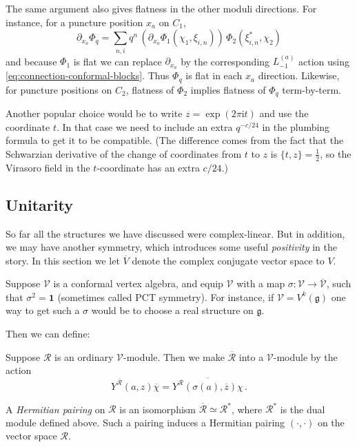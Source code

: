 \documentclass[12pt,letterpaper,reqno]{amsart}
\numberwithin{equation}{section}
\newcommand{\fg}{{\mathfrak g}}
\newcommand{\I}{{\mathrm i}}
\newcommand\bid{{\mathbf 1}}
\newcommand{\vertex}{\mathcal{V}}
\newcommand{\vrep}{\mathcal{R}}
\newcommand{\ti}[1]{\textit{#1}}
\begin{document}
The same argument also gives flatness in the other moduli directions.
For instance, for a puncture position $x_a$ on $C_1$,
\[
\partial_{x_a}\Phi_q
=
\sum_{n,i} q^n\, (\partial_{x_a}\Phi_1(\chi_1,\xi_{i,n}))\,\Phi_2(\xi^*_{i,n},\chi_2)
\]
and because $\Phi_1$ is flat we can replace $\partial_{x_a}$ by the corresponding $L_{-1}^{(a)}$ action
using \eqref{eq:connection-conformal-blocks}. Thus $\Phi_q$ is flat in each $x_a$ direction.
Likewise, for puncture positions on $C_2$, flatness of $\Phi_2$ implies flatness of $\Phi_q$ term-by-term.

Another popular choice would be to write $z = \exp(2 \pi \I t)$ and use the coordinate
$t$. In that case we need to include an extra $q^{-c/24}$ in the plumbing formula
to get it to be compatible.
(The difference comes from the fact that the Schwarzian derivative of the
change of coordinates from $t$ to $z$ is $\{t,z\} = \frac12$, 
so the Virasoro field in the $t$-coordinate has an extra $c/24$.)



\subsection{Unitarity}

So far all the structures we have discussed were complex-linear.
But in addition, we may have another symmetry, which introduces
some useful \ti{positivity} in the story.
In this section we let $\overline{V}$ denote the complex conjugate
vector space to $V$.

Suppose $\vertex$ is a conformal vertex algebra, and
equip $\vertex$ with a map $\sigma: \vertex \to \overline{\vertex}$,
such that $\sigma^2 = \bid$ (sometimes called PCT symmetry).
For instance, if $\vertex = V^k(\fg)$ one way to get such a $\sigma$
would be to choose a real structure on $\fg$.

Then we can define:
\begin{defn}[Conjugate $\vertex$-module]
Suppose $\vrep$ is an ordinary $\vertex$-module.
Then we make $\overline{\vrep}$ into a $\vertex$-module by
the action
\begin{equation}
  Y^{\overline{\vrep}}(a,z) \overline{\chi} = \overline{Y^\vrep(\sigma(a),\overline{z}) \chi} \, .
\end{equation}
\end{defn}

\begin{defn}
A \ti{Hermitian pairing} on $\vrep$ is an isomorphism $\overline{\vrep} \simeq \vrep^*$, where $\vrep^*$ is the dual module defined above.
Such a pairing induces a Hermitian pairing $(\cdot,\cdot)$ on 
the vector space $\vrep$.
\end{defn}
\end{document}
